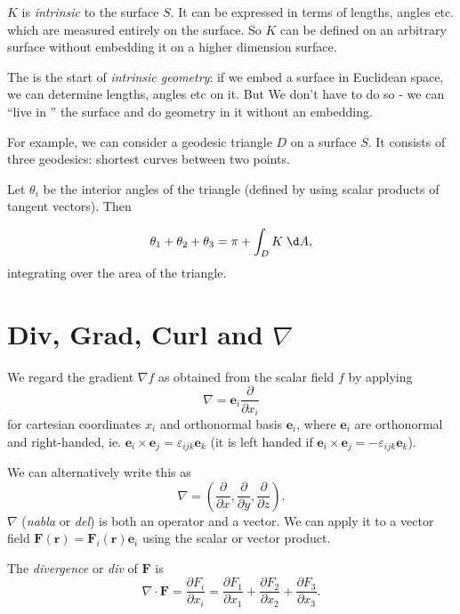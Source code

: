 \documentclass[a4paper]{article}
\begin{document}
\begin{thm}
  $K$ is \emph{intrinsic} to the surface $S$. It can be expressed in terms of lengths, angles etc. which are measured entirely on the surface. So $K$ can be defined on an arbitrary surface without embedding it on a higher dimension surface.
\end{thm}
The is the start of \emph{intrinsic geometry}: if we embed a surface in Euclidean space, we can determine lengths, angles etc on it. But We don't have to do so - we can ``live in '' the surface and do geometry in it without an embedding.

For example, we can consider a geodesic triangle $D$ on a surface $S$. It consists of three geodesics: shortest curves between two points.

Let $\theta_i$ be the interior angles of the triangle (defined by using scalar products of tangent vectors). Then
\begin{thm}
  \[
    \theta_1 +\theta_2 + \theta_3 = \pi + \int_D K\; \d A,
  \]
  integrating over the area of the triangle.
\end{thm}

\section{Div, Grad, Curl and \texorpdfstring{$\nabla$}{nabla}}
We regard the gradient $\nabla f$ as obtained from the scalar field $f$ by applying
\[
  \nabla = \mathbf{e}_i \frac{\partial}{\partial x_i}
\]
for cartesian coordinates $x_i$ and orthonormal basis $\mathbf{e}_i$, where $\mathbf{e}_i$ are orthonormal and right-handed, ie. $\mathbf{e}_i\times \mathbf{e}_j = \varepsilon_{ijk} \mathbf{e}_k$ (it is left handed if $\mathbf{e}_i\times \mathbf{e}_j = -\varepsilon_{ijk} \mathbf{e}_k$).

We can alternatively write this as
\[
  \nabla = \left(\frac{\partial}{\partial x}, \frac{\partial }{\partial y}, \frac{\partial}{\partial z}\right).
\]
$\nabla$ (\emph{nabla} or \emph{del}) is both an operator and a vector. We can apply it to a vector field $\mathbf{F}(\mathbf{r}) = \mathbf{F}_i(\mathbf{r})\mathbf{e}_i$ using the scalar or vector product.

\begin{defi}[Divergence]
  The \emph{divergence} or \emph{div} of $\mathbf{F}$ is
  \[
    \nabla\cdot \mathbf{F} = \frac{\partial F_i}{\partial x_i} = \frac{\partial F_1}{\partial x_1} + \frac{\partial F_2}{\partial x_2} + \frac{\partial F_3}{\partial x_3}.
  \]
\end{defi}
\end{document}
